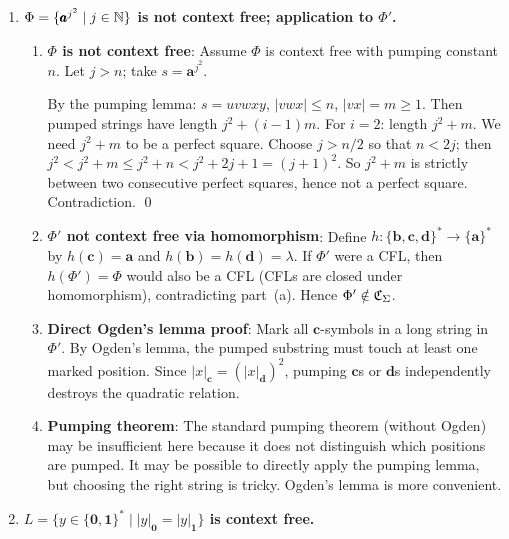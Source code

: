 \begin{enumerate}[{9.}1. ]
For $i=2$: length $= 2^j + m$. We need $2^j + m$ to be a power of 2. But $2^j < 2^j + m \leq 2^j + n < 2^{j+1}$ (since $m \leq n < 2^j$). So $2^j + m$ is strictly between $2^j$ and $2^{j+1}$, which means it is not a power of 2. Contradiction. \qed

\item \textbf{$\Phi = \{\pmb{a}^{j^2} \mid j \in \mathbb{N}\}$ is not context free; application to $\Phi'$.}

\begin{enumerate}
\item \textbf{$\Phi$ is not context free}: Assume $\Phi$ is context free with pumping constant $n$. Let $j > n$; take $s = \pmb{a}^{j^2}$.

By the pumping lemma: $s = uvwxy$, $|vwx| \leq n$, $|vx| = m \geq 1$. Then pumped strings have length $j^2 + (i-1)m$. For $i=2$: length $j^2 + m$. We need $j^2 + m$ to be a perfect square. Choose $j > n/2$ so that $n < 2j$; then $j^2 < j^2 + m \leq j^2 + n < j^2 + 2j + 1 = (j+1)^2$. So $j^2 + m$ is strictly between two consecutive perfect squares, hence not a perfect square. Contradiction. \qed

\item \textbf{$\Phi'$ not context free via homomorphism}: Define $h: \{\pmb{b},\pmb{c},\pmb{d}\}^* \to \{\pmb{a}\}^*$ by $h(\pmb{c}) = \pmb{a}$ and $h(\pmb{b}) = h(\pmb{d}) = \lambda$. If $\Phi'$ were a CFL, then $h(\Phi') = \Phi$ would also be a CFL (CFLs are closed under homomorphism), contradicting part~(a). Hence $\Phi' \notin \mathfrak{C}_\Sigma$.

\item \textbf{Direct Ogden's lemma proof}: Mark all $\pmb{c}$-symbols in a long string in $\Phi'$. By Ogden's lemma, the pumped substring must touch at least one marked position. Since $|x|_{\pmb{c}} = (|x|_{\pmb{d}})^2$, pumping $\pmb{c}$s or $\pmb{d}$s independently destroys the quadratic relation.

\item \textbf{Pumping theorem}: The standard pumping theorem (without Ogden) may be insufficient here because it does not distinguish which positions are pumped. It may be possible to directly apply the pumping lemma, but choosing the right string is tricky. Ogden's lemma is more convenient.
\end{enumerate}

\item \textbf{$L = \{y \in \{\pmb{0},\pmb{1}\}^* \mid |y|_{\pmb{0}} = |y|_{\pmb{1}}\}$ is context free.}


\end{enumerate}
